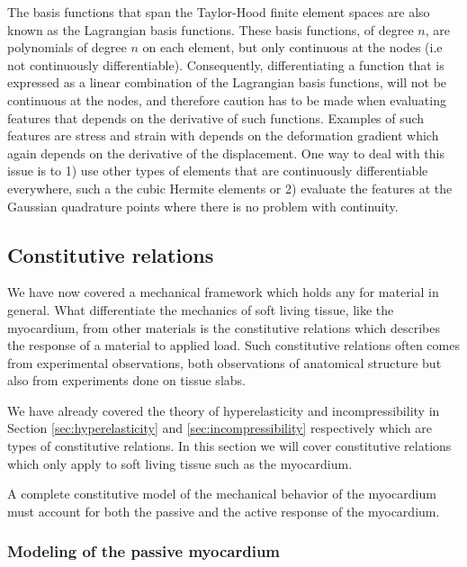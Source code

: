 \begin{remark}
  The basis functions that span the Taylor-Hood
  finite element spaces are also known as the
  Lagrangian basis functions. These basis functions, of
  degree $n$, are polynomials of degree $n$ on each element, but only
  continuous at the nodes (i.e not continuously
  differentiable). Consequently, differentiating a function that is
  expressed as a linear combination of the Lagrangian basis functions,
  will not be continuous at the nodes, and therefore caution has to
  be made when evaluating features that depends on the derivative of
  such functions. Examples of such features are stress and
  strain with depends on the deformation gradient which again depends
  on the derivative of the displacement. One way to deal with this
  issue is to 1) use other types of elements that are continuously
  differentiable everywhere,  such a the cubic Hermite elements or 2) evaluate the features at the
  Gaussian quadrature points where there is no problem with continuity.
\end{remark}


\subsection{Constitutive relations}
\label{sec:constitutive_relations}
We have now covered a mechanical framework which holds any for
material in general. What differentiate the mechanics of soft
living tissue, like the myocardium, from other materials is the
constitutive relations which describes the response of a material to
applied load. Such constitutive relations often comes from
experimental observations, both observations of anatomical structure
but also from experiments done on tissue slabs.

We have already covered the theory of hyperelasticity and incompressibility in Section
\ref{sec:hyperelasticity} and \ref{sec:incompressibility} respectively
which are types of constitutive relations. In this section we will
cover constitutive relations which only apply to soft living tissue
such as the myocardium. 

A complete constitutive model of the mechanical behavior of the
myocardium must account for both the passive and the active response
of the myocardium.


\subsubsection{Modeling of the passive myocardium}

